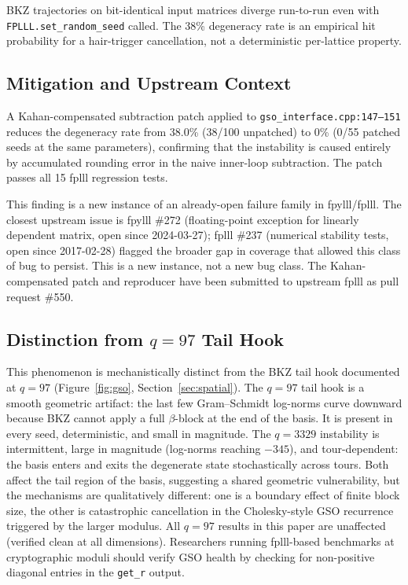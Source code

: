 \documentclass[journal=cic,version=preprint]{iacrj}
\begin{document}
BKZ trajectories on bit-identical input matrices diverge run-to-run even with \texttt{FPLLL.\allowbreak set\_\allowbreak random\_\allowbreak seed} called. The 38\% degeneracy rate is an empirical hit probability for a hair-trigger cancellation, not a deterministic per-lattice property.

\subsection{Mitigation and Upstream Context}

A Kahan-compensated subtraction patch applied to \texttt{gso\_interface.cpp:147--151} reduces the degeneracy rate from 38.0\% (38/100 unpatched) to 0\% (0/55 patched seeds at the same parameters), confirming that the instability is caused entirely by accumulated rounding error in the naive inner-loop subtraction. The patch passes all 15 fplll regression tests.

This finding is a new instance of an already-open failure family in fpylll/fplll. The closest upstream issue is fpylll \#272 (floating-point exception for linearly dependent matrix, open since 2024-03-27); fplll \#237 (numerical stability tests, open since 2017-02-28) flagged the broader gap in coverage that allowed this class of bug to persist. This is a new instance, not a new bug class. The Kahan-compensated patch and reproducer have been submitted to upstream fplll as pull request \#550.

\subsection{Distinction from $q=97$ Tail Hook}

This phenomenon is mechanistically distinct from the BKZ tail hook documented at $q=97$ (Figure~\ref{fig:gso}, Section~\ref{sec:spatial}). The $q=97$ tail hook is a smooth geometric artifact: the last few Gram--Schmidt log-norms curve downward because BKZ cannot apply a full $\beta$-block at the end of the basis. It is present in every seed, deterministic, and small in magnitude. The $q=3329$ instability is intermittent, large in magnitude (log-norms reaching $-345$), and tour-dependent: the basis enters and exits the degenerate state stochastically across tours. Both affect the tail region of the basis, suggesting a shared geometric vulnerability, but the mechanisms are qualitatively different: one is a boundary effect of finite block size, the other is catastrophic cancellation in the Cholesky-style GSO recurrence triggered by the larger modulus. All $q=97$ results in this paper are unaffected (verified clean at all dimensions). Researchers running fplll-based benchmarks at cryptographic moduli should verify GSO health by checking for non-positive diagonal entries in the \texttt{get\_r} output.
\end{document}
